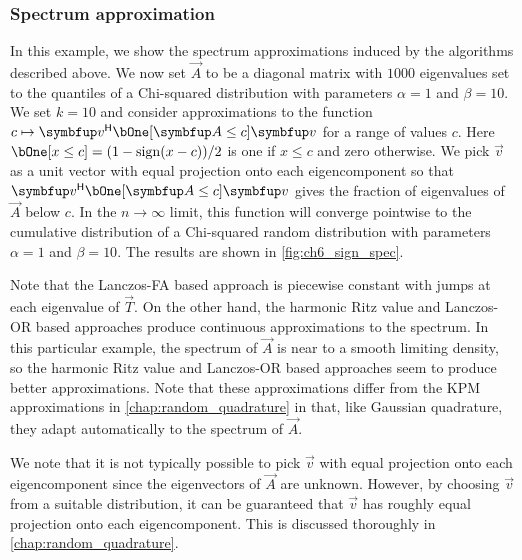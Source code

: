 \subsubsection{Spectrum approximation}

In this example, we show the spectrum approximations induced by the algorithms described above.
We now set $\vec{A}$ to be a diagonal matrix with $1000$ eigenvalues set to the quantiles of a Chi-squared distribution with parameters $\alpha=1$ and $\beta=10$. 
We set $k=10$ and consider approximations to the function $c\mapsto \vec{v}^\cT \bOne [\vec{A} \leq c] \vec{v}$ for a range of values $c$. 
Here $\bOne[x\leq c] = (1-\operatorname{sign}(x-c))/2$ is one if $x\leq c$ and zero otherwise.
We pick $\vec{v}$ as a unit vector with equal projection onto each eigencomponent so that $\vec{v}^\cT \bOne [\vec{A} \leq c] \vec{v}$ gives the fraction of eigenvalues of $\vec{A}$ below $c$.
In the $n\to\infty$ limit, this function will converge pointwise to the cumulative distribution of a Chi-squared random distribution with parameters $\alpha=1$ and $\beta=10$. 
The results are shown in \cref{fig:ch6_sign_spec}.

Note that the Lanczos-FA based approach is piecewise constant with jumps at each eigenvalue of $\vec{T}$.
On the other hand, the harmonic Ritz value and Lanczos-OR based approaches produce continuous approximations to the spectrum.
In this particular example, the spectrum of $\vec{A}$ is near to a smooth limiting density, so the harmonic Ritz value and Lanczos-OR based approaches seem to produce better approximations.
Note that these approximations differ from the KPM approximations in \cref{chap:random_quadrature} in that, like Gaussian quadrature, they adapt automatically to the spectrum of \( \vec{A} \).


We note that it is not typically possible to pick $\vec{v}$ with equal projection onto each eigencomponent since the eigenvectors of $\vec{A}$ are unknown. 
However, by choosing $\vec{v}$ from a suitable distribution, it can be guaranteed that $\vec{v}$ has roughly equal projection onto each eigencomponent.
This is discussed thoroughly in \cref{chap:random_quadrature}.


